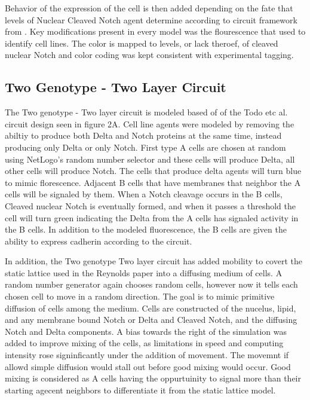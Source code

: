\documentclass[12pt]{ifacconf}
\begin{document}
Behavior of the expression of the cell is then added depending on the fate that levels of Nuclear Cleaved Notch agent determine according to circuit framework from \cite{TP:18} . Key modifications present in every model was the flourescence that \cite{TP:18} used to identify cell lines. The color is mapped to levels, or lack theroef, of cleaved nuclear Notch and color coding was kept consistent with \cite{TP:18} experimental tagging.

\subsection{Two Genotype -  Two Layer Circuit}

The Two genotype - Two layer circuit is modeled based of of the Todo etc al. circuit design seen in figure 2A. Cell line agents were modeled by removing the abiltiy to produce both Delta and Notch proteins at the same time, instead producing only Delta or only Notch. First type A cells are chosen at random using NetLogo's random number selector and these cells will produce Delta, all other cells will produce Notch. The cells that produce delta agents will turn blue to mimic florescence. Adjacent B cells that have membranes that neighbor the A cells will be signaled by them. When a Notch cleavage occurs in the B cells, Cleaved nuclear Notch is eventually formed, and when it passes a threshold the cell will turn green indicating the Delta from the A cells has signaled activity in the B cells. In addition to the modeled fluorescence, the B cells are given the ability to express cadherin according to the circuit. 

In addition, the Two genotype Two layer circuit has added mobility to covert the static lattice used in the Reynolds paper into a diffusing medium of cells. A random number generator again chooses random cells, however now it tells each chosen cell to move in a random direction. The goal is to mimic primitive diffusion of cells among the medium. Cells are constructed of the nucelus, lipid, and any membrane bound Notch or Delta and Cleaved Notch, and the diffusing Notch and Delta components. A bias towards the right of the simulation was added to improve mixing of the cells, as limitations in speed and computing intensity rose signinficantly under the addition of movement. The movemnt if allowd simple diffusion would stall out before good mixing would occur. Good mixing is considered as A cells having the oppurtuinity to signal more than their starting agecent neighbors to differentiate it from the static lattice model.
\end{document}
